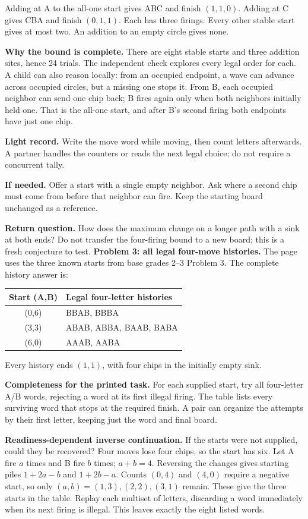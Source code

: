 \documentclass[11pt]{article}
\begin{document}
Adding at A to the all-one start gives ABC and finish \((1,1,0)\). Adding at C gives CBA and finish \((0,1,1)\). Each has three firings. Every other stable start gives at most two. An addition to an empty circle gives none.

\textbf{Why the bound is complete.} There are eight stable starts and three addition sites, hence 24 trials. The independent check explores every legal order for each. A child can also reason locally: from an occupied endpoint, a wave can advance across occupied circles, but a missing one stops it. From B, each occupied neighbor can send one chip back; B fires again only when both neighbors initially held one. That is the all-one start, and after B's second firing both endpoints have just one chip.

\textbf{Light record.} Write the move word while moving, then count letters afterwards. A partner handles the counters or reads the next legal choice; do not require a concurrent tally.

\textbf{If needed.} Offer a start with a single empty neighbor. Ask where a second chip must come from before that neighbor can fire. Keep the starting board unchanged as a reference.

\textbf{Return question.} How does the maximum change on a longer path with a sink at both ends? Do not transfer the four-firing bound to a new board; this is a fresh conjecture to test.
\newpage
\textbf{Problem 3: all legal four-move histories.} The page uses the three known starts from base grades 2--3 Problem 3. The complete history answer is:
\begin{center}\begin{tabular}{c|l}
Start (A,B)&Legal four-letter histories\\\hline
(0,6)&BBAB, BBBA\\
(3,3)&ABAB, ABBA, BAAB, BABA\\
(6,0)&AAAB, AABA
\end{tabular}\end{center}
Every history ends \((1,1)\), with four chips in the initially empty sink.

\textbf{Completeness for the printed task.} For each supplied start, try all four-letter A/B words, rejecting a word at its first illegal firing. The table lists every surviving word that stops at the required finish. A pair can organize the attempts by their first letter, keeping just the word and final board.

\textbf{Readiness-dependent inverse continuation.} If the starts were not supplied, could they be recovered? Four moves lose four chips, so the start has six. Let A fire \(a\) times and B fire \(b\) times; \(a+b=4\). Reversing the changes gives starting piles \(1+2a-b\) and \(1+2b-a\). Counts \((0,4)\) and \((4,0)\) require a negative start, so only \((a,b)=(1,3),(2,2),(3,1)\) remain. These give the three starts in the table. Replay each multiset of letters, discarding a word immediately when its next firing is illegal. This leaves exactly the eight listed words.
\end{document}
